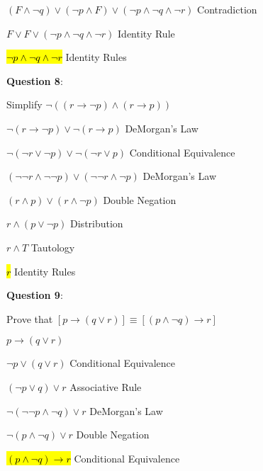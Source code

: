 \documentclass{article} %
\newcommand{\question}[2][]{\begin{flushleft}
        \textbf{Question #1}: \textit{#2}

\end{flushleft}}
\begin{document}
        \tabto{0.98cm}$(F \land \neg q) \lor (\neg p \land F) \lor (\neg p \land \neg q \land \neg r)$ \tabto*{9cm} Contradiction
        
        \tabto{0.98cm}$F \lor F \lor (\neg p \land \neg q \land \neg r)$ \tabto*{9cm} Identity Rule

        \tabto{0.98cm}\hl{$\neg p \land \neg q \land \neg r$} \tabto*{9cm} Identity Rules

    \question[8]{}

        Simplify $\neg ((r \rightarrow \neg p) \land (r \rightarrow p))$

        \hspace*{0.05cm}

        $\neg(r \rightarrow \neg p) \lor \neg(r \rightarrow p) $ \tabto*{5cm} DeMorgan's Law

        $\neg(\neg r \lor \neg p) \lor \neg( \neg r \lor p) $ \tabto*{5cm} Conditional Equivalence

        $(\neg \neg r \land \neg \neg p) \lor (\neg \neg r \land \neg p) $ \tabto*{5cm} DeMorgan's Law

        $(r \land p) \lor (r \land \neg p)$ \tabto*{5cm} Double Negation \hspace*{2cm}

        $r \land (p \lor \neg p)$ \tabto*{5cm} Distribution

        $r \land T$ \tabto*{5cm} Tautology

        \hl{$r$} \tabto*{5cm} Identity Rules

    \newpage
    \question[9]{}

        Prove that $[p \rightarrow (q \lor r)] \equiv [(p \land \neg q) \rightarrow r]$

        \hspace{0cm}

        $p \rightarrow (q \lor r)$

        $\neg p \lor (q \lor r)$ \tabto*{3.5cm} Conditional Equivalence
        
        $(\neg p \lor q) \lor r$ \tabto*{3.5cm} Associative Rule

        $\neg (\neg \neg p \land \neg q) \lor r$ \tabto*{3.5cm} DeMorgan's Law

        $\neg (p \land \neg q) \lor r$ \tabto*{3.5cm} Double Negation

        \hl{$(p \land \neg q) \rightarrow r$} \tabto*{3.5cm} Conditional Equivalence

        \hspace{0cm}
\end{document}
